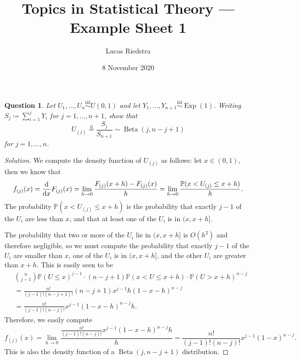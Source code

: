 \documentclass{article}
\title{Topics in Statistical Theory --- Example Sheet 1} %
\author{Lucas Riedstra}
\date{8 November 2020} %
\theoremstyle{plain}
\newtheorem{question}{Question}
\theoremstyle{remark}
\newenvironment{solution}{\begin{proof}[Solution]\renewcommand\qedsymbol{}}{\end{proof}}
\newcommand{\Bb}{\mathbb}
\newcommand{\Rm}{\mathrm}
\newcommand{\PP}{\Bb P}
\newcommand\ceq\coloneqq %
\newcommand\deq{\overset{\Rm{d}}=}
\newcommand\iid{\overset{\Rm{iid}}{\sim}}
\DeclareMathOperator\Exp{Exp}
\DeclareMathOperator\Beta{Beta}
\begin{document}
\maketitle

\begin{question}
    Let $U_1, \dotsc, U_n \iid U(0, 1)$ and let $Y_1, \dotsc, Y_{n+1} \iid \Exp(1)$. Writing $S_j \ceq \sum_{i=1}^j Y_i$ for $j = 1, \dotsc, n+1$, show that
    \[
    U_{(j)} \deq \frac{S_j}{S_{n+1}} \sim \Beta(j, n - j + 1)
    \]
    for $j = 1, \dotsc, n$. 
\end{question}

\begin{solution}
%
%

We compute the density function of $U_{(j)}$ as follows: let $x \in (0, 1)$, then we know that 
\[
f_{(j)}(x) = \dv{x} F_{(j)}(x) = \lim_{h\to 0} \frac{F_{(j)}(x+h) - F_{(j)}(x)}{h} = \lim_{h \to 0} \frac{\PP(x < U_{(j)} \leq x + h)}{h}. 
\]
The probability $\PP(x < U_{(j)} \leq x + h)$ is the probability that exactly $j-1$ of the $U_{i}$ are less than $x$, and that at least one of the $U_{i}$ is in $(x, x+ h]$. 

The probability that two or more of the $U_{i}$ lie in $(x, x+h]$ is $O(h^2)$ and therefore negligible, so we must compute the probability that exactly $j-1$ of the $U_{i}$ are smaller than $x$, one of the $U_{i}$ is in $(x, x+h]$, and the other $U_{i}$ are greater than $x+h$. This is easily seen to be
\begin{align*}
&\binom{n}{j-1} \PP(U \leq x)^{j-1} \cdot (n - j + 1) \PP(x < U \leq x + h) \cdot \PP(U > x + h)^{n-j} \\
&= \frac{n!}{(j-1)!(n-j+1)!} (n-j+1) x^{j-1} h (1 - x - h)^{n-j} \\
&= \frac{n!}{(j-1)!(n-j)!} x^{j-1} (1-x-h)^{n-j} h. 
\end{align*}
Therefore, we easily compute
\[
f_{(j)}(x) = \lim_{h \to 0} \frac{\frac{n!}{(j-1)!(n-j)!} x^{j-1} (1-x-h)^{n-j} h}{h} = \frac{n!}{(j-1)!(n-j)!} x^{j-1} (1-x)^{n-j}. 
\]
This is also the density function of a $\Beta(j, n-j+1)$ distribution. 


\end{solution}
\end{document}
